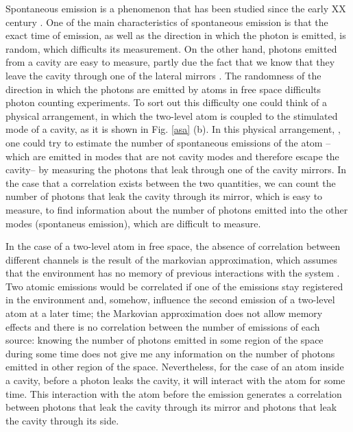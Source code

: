 \documentclass[%
 reprint,
 amsmath,amssymb,
 aps, 
]{revtex4-2}
\begin{document}
Spontaneous emission is a phenomenon that has been studied since the
early XX century \cite{10.2307/94746, 1917PhyZ...18..121E}. One of the
main characteristics of spontaneous emission is that
 the exact time of emission, as well as
the direction in which the photon is emitted, is random, which
difficults its measurement. On the other hand, photons emitted from a
cavity are easy to measure, partly due the fact that we know that they
leave the cavity through one of the lateral mirrors \cite{326305,
  doi:10.1063/1.113345}. The randomness of the direction in which the
photons are emitted by atoms in free space difficults photon counting
experiments. To sort out this difficulty one could think of a physical
arrangement, in which the two-level atom is coupled to the stimulated
mode of a cavity, as it is shown in Fig. \ref{asa} (b). In this
physical arrangement, , one could
try to estimate the number of spontaneous emissions of the atom
--which are emitted in modes that are not cavity modes and therefore
escape the cavity-- by measuring the photons that leak through one of
the cavity mirrors. In the case that a
correlation exists between the two quantities, we can count the number
of photons that leak the cavity through its mirror, which is easy to
measure, to find information about the number of photons emitted into
the other modes (spontaneus emission), which are difficult to measure.

In the case of a two-level atom in free space, the absence of
correlation between different channels is the result of the markovian
approximation, which assumes that the environment has no memory of
previous interactions with the system \cite{daley2014quantum}. Two
atomic emissions would be correlated if one of the emissions stay
registered in the environment and, somehow, influence the second
emission of a two-level atom at a later time; the Markovian
approximation does not allow memory effects and there is no
correlation between the number of emissions of each source: knowing
the number of photons emitted in some region of the space during some
time does not give me any information on the number of photons emitted
in other region of the space. Nevertheless, for the case of an atom
inside a cavity, before a photon leaks the cavity, it will interact
with the atom for some time. This interaction with the atom before the
emission generates a correlation between photons that leak the cavity
through its mirror and photons that leak the cavity through its side.
\end{document}
